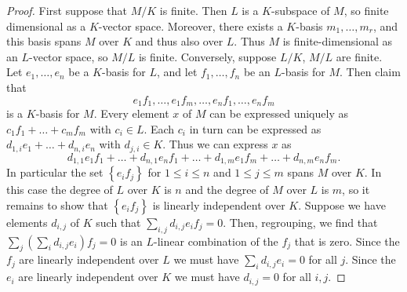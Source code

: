 \documentclass{article}
\newcommand{\rb}[1]{\left( #1 \right)}
\newcommand{\cb}[1]{\left\{ #1 \right\}}
\theoremstyle{definition}\newtheorem{definition}{Definition}[section]
\theoremstyle{definition}\newtheorem{remark}[definition]{Remark}
\theoremstyle{definition}\newtheorem*{example}{Example}
\theoremstyle{definition}\newtheorem*{note}{Note}
\begin{document}
\begin{proof}
First suppose that $ M / K $ is finite. Then $ L $ is a $ K $-subspace of $ M $, so finite dimensional as a $ K $-vector space. Moreover, there exists a $ K $-basis $ m_1, \dots, m_r $, and this basis spans $ M $ over $ K $ and thus also over $ L $. Thus $ M $ is finite-dimensional as an $ L $-vector space, so $ M / L $ is finite. Conversely, suppose $ L / K $, $ M / L $ are finite. Let $ e_1, \dots, e_n $ be a $ K $-basis for $ L $, and let $ f_1, \dots, f_n $ be an $ L $-basis for $ M $. Then claim that
$$ e_1f_1, \dots, e_1f_m, \dots, e_nf_1, \dots, e_nf_m $$
is a $ K $-basis for $ M $. Every element $ x $ of $ M $ can be expressed uniquely as $ c_1f_1 + \dots + c_mf_m $ with $ c_i \in L $. Each $ c_i $ in turn can be expressed as $ d_{1, i}e_1 + \dots + d_{n, i}e_n $ with $ d_{j, i} \in K $. Thus we can express $ x $ as
$$ d_{1, 1}e_1f_1 + \dots + d_{n, 1}e_nf_1 + \dots + d_{1, m}e_1f_m + \dots + d_{n, m}e_nf_m. $$
In particular the set $ \cb{e_if_j} $ for $ 1 \le i \le n $ and $ 1 \le j \le m $ spans $ M $ over $ K $. In this case the degree of $ L $ over $ K $ is $ n $ and the degree of $ M $ over $ L $ is $ m $, so it remains to show that $ \cb{e_if_j} $ is linearly independent over $ K $. Suppose we have elements $ d_{i, j} $ of $ K $ such that $ \sum_{i, j} d_{i, j}e_if_j = 0 $. Then, regrouping, we find that $ \sum_j \rb{\sum_i d_{i, j}e_i}f_j = 0 $ is an $ L $-linear combination of the $ f_j $ that is zero. Since the $ f_j $ are linearly independent over $ L $ we must have $ \sum_i d_{i, j}e_i = 0 $ for all $ j $. Since the $ e_i $ are linearly independent over $ K $ we must have $ d_{i, j} = 0 $ for all $ i, j $.
\end{proof}
\end{document}
